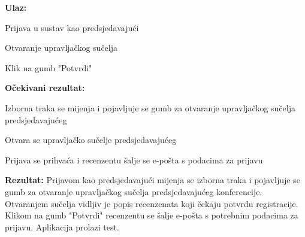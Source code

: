 			  \textbf{Ulaz:}

			 \begin{packed_enum}
			 	\item {Prijava u sustav kao predsjedavajući}
			 	\item {Otvaranje upravljačkog sučelja}
			 	\item {Klik na gumb "Potvrdi"}
			 \end{packed_enum}

			  \textbf{Očekivani rezultat:}

			 \begin{packed_enum}
			 	\item {Izborna traka se mijenja i pojavljuje se gumb za otvaranje upravljačkog sučelja predsjedavajućeg}
			 	\item {Otvara se upravljačko sučelje predsjedavajućeg}
			 	\item {Prijava se prihvaća i recenzentu šalje se e-pošta s podacima za prijavu}
			 \end{packed_enum}

			 \textbf{Rezultat: }Prijavom kao predsjedavajući mijenja se izborna traka i pojavljuje se gumb za otvaranje upravljačkog sučelja predsjedavajućeg konferencije. Otvaranjem sučelja vidljiv je popis recenzenata koji čekaju potvrdu registracije. Klikom na gumb "Potvrdi" recenzentu se šalje e-pošta s potrebnim podacima za prijavu. {\color{green} Aplikacija prolazi test.}
			 

